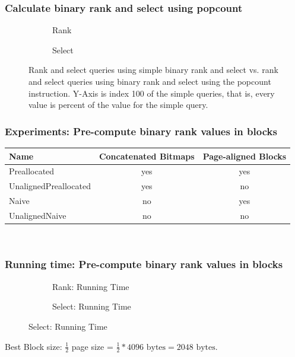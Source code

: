 \documentclass{beamer}
\begin{document}
\begin{frame}
\frametitle{Calculate binary rank and select using popcount}

\begin{figure}[h!]\tiny
	\begin{subfigure}{\textwidth}
		\center \scalebox{.6}{}
		\caption{\tiny{Rank}}
	\end{subfigure}
	\begin{subfigure}{\textwidth}
		\center \scalebox{.6}{}
		\caption{\tiny{Select}}
	\end{subfigure}
	\caption{\tiny{Rank and select queries using simple binary rank and select vs. rank and select queries using binary rank and select using the popcount instruction. Y-Axis is index 100 of the simple queries, that is, every value is percent of the value for the simple query.}}
\end{figure}
\end{frame}
\begin{frame}
\frametitle{Experiments: Pre-compute binary rank values in blocks}
\begin{tabular}{|lcc|}
\hline
Name						& Concatenated Bitmaps	& Page-aligned Blocks	\\ \hline
Preallocated				& yes					& yes					\\ \hline
UnalignedPreallocated	& yes					& no						\\ \hline
Naive					& no						& yes					\\ \hline
UnalignedNaive			& no						& no						\\ \hline
\end{tabular}\\
\end{frame}



\begin{frame}
\frametitle{Running time: Pre-compute binary rank values in blocks}
\begin{figure}
\begin{subfigure}{0.45\textwidth}
	\begin{tiny}	
	\scalebox{.7}{}
	\end{tiny}
	\caption{Rank: Running Time}
\end{subfigure}
\hfill
\begin{subfigure}{0.45\textwidth}
	\begin{tiny}	
	\scalebox{.7}{}
	\end{tiny}
	\caption{Select: Running Time}
\end{subfigure}
\end{figure}
Best Block size: $\frac{1}{2}$ page size = $\frac{1}{2}*4096 \text{ bytes} = 2048 \text{ bytes}$.
\end{frame}
\end{document}
